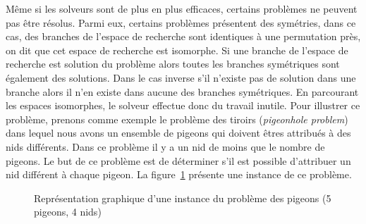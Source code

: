 Même si les solveurs sont de plus en plus efficaces, certains problèmes ne peuvent pas être résolus.
Parmi eux, certains problèmes présentent des symétries, dans ce cas, des branches de l'espace de recherche 
sont identiques à une permutation près, on dit que cet espace de recherche est isomorphe.
Si une branche de l'espace de recherche est solution du problème alors toutes les branches symétriques
sont également des solutions. Dans le cas inverse s'il n'existe pas de solution dans une branche alors il n'en
existe dans aucune des branches symétriques.
En parcourant les espaces isomorphes, le solveur effectue donc du travail inutile.
Pour illustrer ce problème, prenons comme exemple le problème des tiroirs (\textit{pigeonhole problem}) dans lequel nous avons un ensemble de pigeons qui doivent êtres attribués à des nids différents. Dans ce problème il y a un nid de moins que le nombre de pigeons.
Le but de ce problème est de déterminer s'il est possible d'attribuer un nid différent à chaque pigeon.
La figure~\ref{fig:holefr} présente une instance de ce problème.
\begin{figure}[!htbp]
 \centering
 \caption{Représentation graphique d'une instance du problème des pigeons (5 pigeons, 4 nids)}
 \label{fig:holefr}
\end{figure}

